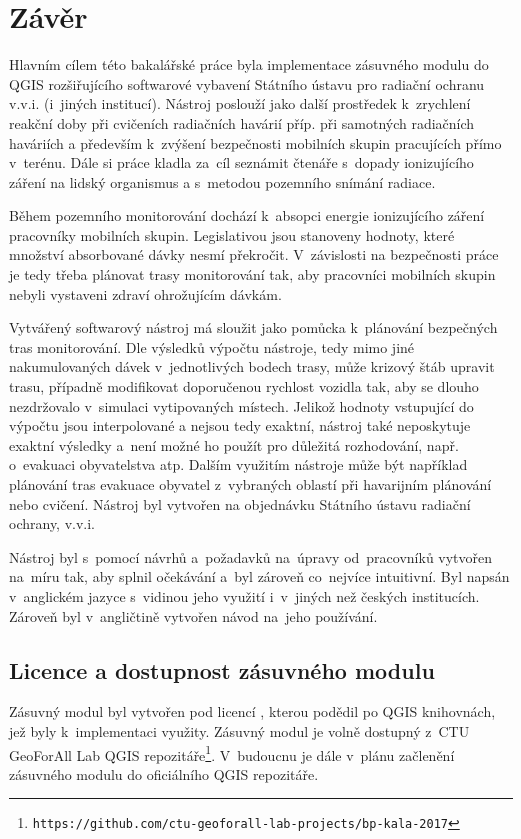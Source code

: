 \chapter{Závěr}
\label{5-zaver}

Hlavním cílem této bakalářské práce byla implementace zásuvného modulu
do QGIS rozšiřujícího softwarové vybavení Státního ústavu pro radiační
ochranu v.v.i. (i~jiných institucí). Nástroj poslouží jako další
prostředek k~zrychlení reakční doby při cvičeních radiačních havárií
příp. při samotných radiačních haváriích a především k~zvýšení
bezpečnosti mobilních skupin pracujících přímo v~terénu. Dále si práce
kladla za~cíl seznámit čtenáře s~dopady ionizujícího záření na lidský
organismus a s~metodou pozemního snímání radiace.

Během pozemního monitorování dochází
k~absopci energie ionizujícího záření pracovníky mobilních skupin. 
Legislativou jsou
stanoveny hodnoty, které množství absorbované dávky nesmí
překročit. V~závislosti na bezpečnosti práce je tedy třeba plánovat
trasy monitorování tak, aby pracovníci mobilních skupin nebyli vystaveni zdraví
ohrožujícím dávkám.

Vytvářený softwarový nástroj má sloužit jako pomůcka k~plánování bezpečných tras
monitorování. Dle výsledků výpočtu nástroje, tedy mimo jiné
nakumulovaných dávek v~jednotlivých bodech trasy, může krizový štáb
upravit trasu, případně mo\-difikovat doporučenou rychlost vozidla tak,
aby se dlouho nezdržovalo v~simulaci vytipovaných 
místech. Jelikož hodnoty vstupující do výpočtu jsou interpolované a
nejsou tedy exaktní, nástroj také neposkytuje exaktní výsledky a~není
možné ho použít pro důležitá rozhodování, např. o~evakuaci
obyvatelstva atp. Dalším využitím nástroje může být například
plánování tras evakuace obyvatel z~vybraných oblastí při havarijním
plánování nebo cvičení. Nástroj byl vytvořen na objednávku Státního
ústavu radiační ochrany, v.v.i.

Nástroj byl s~pomocí návrhů a~požadavků na~úpravy od~pracovníků
 vytvořen na~míru tak, aby splnil očekávání a~byl zároveň 
co~nejvíce intuitivní. Byl napsán v~anglickém jazyce s~vidinou
jeho využití i~v~jiných než českých institucích. Zároveň byl
v~angličtině vytvořen návod na~jeho používání.

\section{Licence a dostupnost zásuvného modulu} Zásuvný modul byl
vytvořen pod licencí , kterou podědil po QGIS knihovnách,
jež byly k~implementaci využity. Zásuvný modul je volně dostupný z~CTU
GeoForAll Lab QGIS
repozitáře\footnote{\texttt{https://github.com/ctu-geoforall-lab-projects/bp-kala-2017}}. V~budoucnu
je dále v~plánu začlenění zásuvného modulu do oficiálního QGIS
repozitáře.

 



